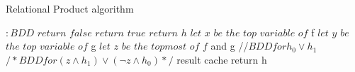 \begin{algorithm}
\begin{algorithmic}
\caption{Relational Product algorithm}
\label{Relational Product algorithm}
$:BDD$
 \State $return$ $false$
 \State $return$ $true$
 \State $return$ $h$
\Else
 \State $let$ $x$ $be$ $the$ $top$ $variable$ $of$ f
 \State $let$ $y$ $be$ $the$ $top$ $variable$ $of$ g
 \State $let$ $z$ $be$ $the$ $topmost$  $of$ $f$ and g
   //$BDD for h_0 \lor h_1$
 \Else
  \State $      /*BDD for (z\land h_1) \lor (\neg z\land h_0)*/$
 \EndIf
  result cache
 \State return h
\EndIf
\EndProcedure
\end{algorithmic}
\end{algorithm}